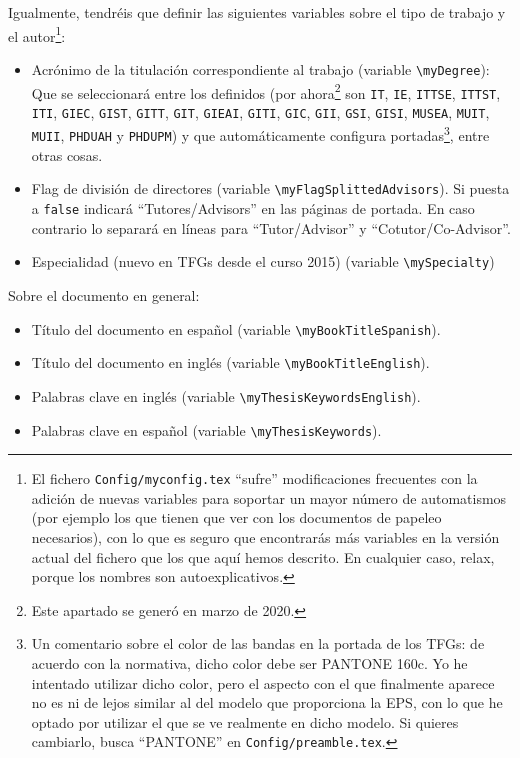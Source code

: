 Igualmente, tendréis que definir las siguientes variables sobre el tipo de trabajo y el autor\footnote{El fichero  \texttt{Config/myconfig.tex} ``sufre'' modificaciones frecuentes con la adición de nuevas variables para soportar un mayor número de automatismos (por ejemplo los que tienen que ver con los documentos de papeleo necesarios), con lo que es seguro que encontrarás más variables en la versión actual del fichero que los que aquí hemos descrito. En cualquier caso, relax, porque los nombres son autoexplicativos.}:

\begin{itemize}
  \item Acrónimo de la titulación correspondiente al trabajo (variable \texttt{\textbackslash{}myDegree}): Que se seleccionará entre los definidos (por ahora\footnote{Este apartado se generó en marzo de 2020.} son \texttt{IT}, \texttt{IE}, \texttt{ITTSE}, \texttt{ITTST}, \texttt{ITI}, \texttt{GIEC}, \texttt{GIST}, \texttt{GITT}, \texttt{GIT}, \texttt{GIEAI}, \texttt{GITI}, \texttt{GIC}, \texttt{GII}, \texttt{GSI}, \texttt{GISI}, \texttt{MUSEA}, \texttt{MUIT}, \texttt{MUII}, \texttt{PHDUAH} y \texttt{PHDUPM}) y que automáticamente configura portadas\footnote{Un comentario sobre el color de las bandas en la portada de los TFGs: de acuerdo con la normativa, dicho color debe ser PANTONE 160c. Yo he intentado utilizar dicho color, pero el aspecto con el que finalmente aparece no es ni de lejos similar al del modelo que proporciona la EPS, con lo que he optado por utilizar el que se ve realmente en dicho modelo. Si quieres cambiarlo, busca ``PANTONE'' en \texttt{Config/preamble.tex}.}, entre otras cosas.

  \item Flag de división de directores (variable \texttt{\textbackslash{}myFlagSplittedAdvisors}). Si puesta a \texttt{false} indicará ``Tutores/Advisors'' en las páginas de portada. En caso contrario lo separará en líneas para ``Tutor/Advisor'' y ``Cotutor/Co-Advisor''.

  \item Especialidad (nuevo en TFGs desde el curso 2015) (variable \texttt{\textbackslash{}mySpecialty})

\end{itemize}

Sobre el documento en general:

\begin{itemize}
  \item Título del documento en español (variable \texttt{\textbackslash{}myBookTitleSpanish}).
  \item Título del documento en inglés (variable \texttt{\textbackslash{}myBookTitleEnglish}).
  \item Palabras clave en inglés (variable \texttt{\textbackslash{}myThesisKeywordsEnglish}).
  \item Palabras clave en español (variable \texttt{\textbackslash{}myThesisKeywords}).


\end{itemize}

